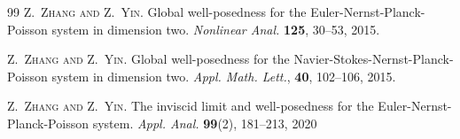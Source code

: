 \documentclass[10pt,twoside,reqno]{amsart}
\numberwithin{figure}{section}
\numberwithin{equation}{section}
\theoremstyle{definition}
\newcommand{\1}{\mathbbm{1}}
\begin{document}
\begin{thebibliography}{99}
 \textsc{Z.~Zhang and Z.~Yin}. Global well-posedness for the {E}uler-{N}ernst-{P}lanck-{P}oisson system in dimension two. {\it Nonlinear Anal.} {\bf 125}, 30--53, 2015.

 \textsc{Z.~Zhang and Z.~Yin}. Global well-posedness for the {N}avier-{S}tokes-{N}ernst-{P}lanck-{P}oisson system in dimension two. {\it Appl. Math. Lett.}, {\bf 40}, 102--106, 2015.

 \textsc{Z.~Zhang and Z.~Yin}. The inviscid limit and well-posedness for the {E}uler-{N}ernst-{P}lanck-{P}oisson system. {\it Appl. Anal.} {\bf 99}(2), 181--213, 2020

\end{thebibliography}
\end{document}
